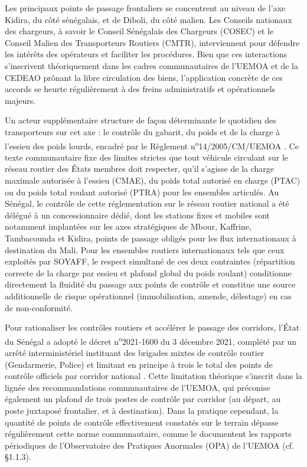 Les principaux points de passage frontaliers se concentrent au niveau de l'axe Kidira, du côté sénégalais, et de Diboli, du côté malien. Les Conseils nationaux des chargeurs, à savoir le Conseil Sénégalais des Chargeurs (COSEC) et le Conseil Malien des Transporteurs Routiers (CMTR), interviennent pour défendre les intérêts des opérateurs et faciliter les procédures. Bien que ces interactions s'inscrivent théoriquement dans les cadres communautaires de l'UEMOA et de la CEDEAO prônant la libre circulation des biens, l'application concrète de ces accords se heurte régulièrement à des freins administratifs et opérationnels majeurs.

Un acteur supplémentaire structure de façon déterminante le quotidien des transporteurs sur cet axe : le contrôle du gabarit, du poids et de la charge à l'essieu des poids lourds, encadré par le Règlement n\textsuperscript{o}14/2005/CM/UEMOA \cite{REGLEMENTNdeg142005}. Ce texte communautaire fixe des limites strictes que tout véhicule circulant sur le réseau routier des États membres doit respecter, qu'il s'agisse de la charge maximale autorisée à l'essieu (CMAE), du poids total autorisé en charge (PTAC) ou du poids total roulant autorisé (PTRA) pour les ensembles articulés. Au Sénégal, le contrôle de cette réglementation sur le réseau routier national a été délégué à un concessionnaire dédié, dont les stations fixes et mobiles sont notamment implantées sur les axes stratégiques de Mbour, Kaffrine, Tambacounda et Kidira, points de passage obligés pour les flux internationaux à destination du Mali. Pour les ensembles routiers internationaux tels que ceux exploités par SOYAFF, le respect simultané de ces deux contraintes (répartition correcte de la charge par essieu et plafond global du poids roulant) conditionne directement la fluidité du passage aux points de contrôle et constitue une source additionnelle de risque opérationnel (immobilisation, amende, délestage) en cas de non-conformité.

Pour rationaliser les contrôles routiers et accélérer le passage des corridors, l'État du Sénégal a adopté le décret n\textsuperscript{o}2021-1600 du 3 décembre 2021, complété par un arrêté interministériel instituant des brigades mixtes de contrôle routier (Gendarmerie, Police) et limitant en principe à trois le total des points de contrôle officiels par corridor national \cite{ControlesRoutiersAu2026}. Cette limitation théorique s'inscrit dans la lignée des recommandations communautaires de l'UEMOA, qui préconise également un plafond de trois postes de contrôle par corridor (au départ, au poste juxtaposé frontalier, et à destination). Dans la pratique cependant, la quantité de points de contrôle effectivement constatés sur le terrain dépasse régulièrement cette norme communautaire, comme le documentent les rapports périodiques de l'Observatoire des Pratiques Anormales (OPA) de l'UEMOA (cf. §1.1.3).

